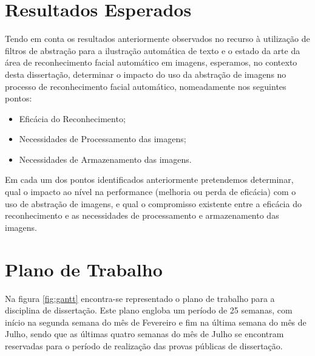\section{Resultados Esperados}
Tendo em conta os resultados anteriormente observados no recurso à utilização de filtros de abstração para a ilustração automática de texto e o estado da arte da área de reconhecimento facial automático em imagens, esperamos, no contexto desta dissertação, determinar o impacto do uso da abstração de imagens no processo de reconhecimento facial automático, nomeadamente nos seguintes pontos:
\begin{itemize}
\item Eficácia do Reconhecimento;
\item Necessidades de Processamento das imagens;
\item Necessidades de Armazenamento das imagens.
\end{itemize}
Em cada um dos pontos identificados anteriormente pretendemos determinar, qual o impacto ao nível na performance (melhoria ou perda de eficácia) com o uso de abstração de imagens, e qual o compromisso existente entre a eficácia do reconhecimento e as necessidades de processamento e armazenamento das imagens.

\section{Plano de Trabalho}
Na figura \ref{fig:gantt} encontra-se representado o plano de trabalho para a disciplina de dissertação. Este plano engloba um período de 25 semanas, com início na segunda semana do mês de Fevereiro e fim na última semana do mês de Julho, sendo que as últimas quatro semanas do mês de Julho se encontram reservadas para o período de realização das provas públicas de dissertação.

